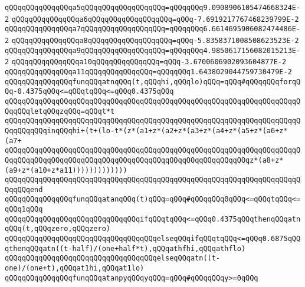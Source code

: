\verb|qQQqqQQqqQQqqQQqa5qQQqqQQqqQQqqQQqqQQq=qQQqqQQq9.0908906105474668324E-2|\newline
\verb|qQQqqQQqqQQqqQQqa6qQQqqQQqqQQqqQQqqQQq=qQQq-7.6919217767468239799E-2|\newline
\verb|qQQqqQQqqQQqqQQqa7qQQqqQQqqQQqqQQqqQQq=qQQqqQQq6.6614695906082474486E-2|\newline
\verb|qQQqqQQqqQQqqQQqa8qQQqqQQqqQQqqQQqqQQq=qQQq-5.8358371008508623523E-2|\newline
\verb|qQQqqQQqqQQqqQQqa9qQQqqQQqqQQqqQQqqQQq=qQQqqQQq4.9850617156082015213E-2|\newline
\verb|qQQqqQQqqQQqqQQqa10qQQqqQQqqQQqqQQq=qQQq-3.6700606902093604877E-2|\newline
\verb|qQQqqQQqqQQqqQQqa11qQQqqQQqqQQqqQQq=qQQqqQQq1.6438029044759730479E-2|\newline
\newline
\verb|qQQqqQQqqQQqqQQqfunqQQqatnqQQq(t,qQQqhi,qQQqlo)qQQq=qQQq#qQQqqQQqforqQQq-0.4375qQQq<=qQQqtqQQq<=qQQq0.4375qQQq|\newline
\verb|qQQqqQQqqQQqqQQqqQQqqQQqqQQqqQQqqQQqqQQqqQQqqQQqqQQqqQQqqQQqqQQqqQQqqQQqqQQqletqQQqzqQQq=qQQqt*t|\newline
\verb|qQQqqQQqqQQqqQQqqQQqqQQqqQQqqQQqqQQqqQQqqQQqqQQqqQQqqQQqqQQqqQQqqQQqqQQqqQQqqQQqinqQQqhi+(t+(lo-t*(z*(a1+z*(a2+z*(a3+z*(a4+z*(a5+z*(a6+z*(a7+|\newline
\verb|qQQqqQQqqQQqqQQqqQQqqQQqqQQqqQQqqQQqqQQqqQQqqQQqqQQqqQQqqQQqqQQqqQQqqQQqqQQqqQQqqQQqqQQqqQQqqQQqqQQqqQQqqQQqqQQqqQQqqQQqqQQqqQQqz*(a8+z*(a9+z*(a10+z*a11)))))))))))))|\newline
\verb|qQQqqQQqqQQqqQQqqQQqqQQqqQQqqQQqqQQqqQQqqQQqqQQqqQQqqQQqqQQqqQQqqQQqqQQqqQQqend|\newline
\newline
\verb|qQQqqQQqqQQqqQQqfunqQQqatanqQQq(t)qQQq=qQQq#qQQqqQQq0qQQq<=qQQqtqQQq<=qQQq1qQQq|\newline
\verb|qQQqqQQqqQQqqQQqqQQqqQQqqQQqqQQqifqQQqtqQQq<=qQQq0.4375qQQqthenqQQqatnqQQq(t,qQQqzero,qQQqzero)|\newline
\verb|qQQqqQQqqQQqqQQqqQQqqQQqqQQqqQQqqQQqelseqQQqifqQQqtqQQq<=qQQq0.6875qQQqthenqQQqatn((t-half)/(one+half*t),qQQqathfhi,qQQqathflo)|\newline
\verb|qQQqqQQqqQQqqQQqqQQqqQQqqQQqqQQqqQQqelseqQQqatn((t-one)/(one+t),qQQqat1hi,qQQqat1lo)|\newline
\newline
\verb|qQQqqQQqqQQqqQQqfunqQQqatanpyqQQqyqQQq=qQQq#qQQqqQQqy>=0qQQq|\newline
